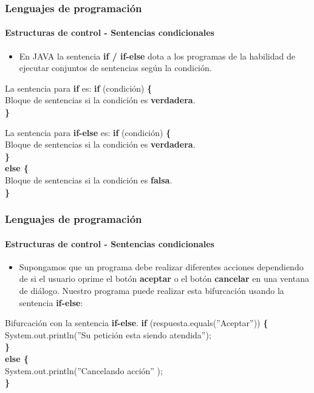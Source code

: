 \documentclass{beamer}
\begin{document}
\begin{frame}
  \frametitle{Lenguajes de programación}
  \framesubtitle{Estructuras de control - Sentencias condicionales}

  \begin{itemize}
  \item En JAVA la sentencia \textbf{if / if-else}  dota a los programas de la habilidad de ejecutar conjuntos de sentencias según la condición.
  \end{itemize}

  \begin{block}{La sentencia para \textbf{if} es:}
    {\scriptsize
      \textbf{if} (condición) \textbf{\{} \\
      \hspace{0.3cm} Bloque de sentencias si la condición es \textbf{verdadera}.  \\
      \textbf{\}}
    }
  \end{block}

  \begin{block}{La sentencia para \textbf{if-else} es:}
    {\scriptsize
      \textbf{if} (condición) \textbf{\{} \\
      \hspace{0.3cm} Bloque de sentencias si la condición es \textbf{verdadera}.  \\
      \textbf{\}}\\
      \textbf{else \{}\\
      \hspace{0.3cm} Bloque de sentencias si la condición es \textbf{falsa}.  \\
      \textbf{\}}
    }
  \end{block}
\end{frame}

\begin{frame}
  \frametitle{Lenguajes de programación}
  \framesubtitle{Estructuras de control - Sentencias condicionales}

  \begin{itemize}
  \item Supongamos que un programa debe realizar diferentes acciones dependiendo de si el usuario oprime el botón \textbf{aceptar} o el botón \textbf{cancelar} en una ventana de diálogo. Nuestro programa puede realizar esta bifurcación usando la sentencia \textbf{if-else}:
  \end{itemize}
  
  \begin{block}{Bifurcación con la sentencia \textbf{if-else}.}
    {\scriptsize
      \textbf{if} (respuesta.equals(''Aceptar'')) \textbf{\{} \\
      \hspace{0.3cm} System.out.println(''Su petición esta siendo atendida'');  \\
      \textbf{\}}\\
      \textbf{else \{}\\
      \hspace{0.3cm} System.out.println(''Cancelando acción'' );  \\
      \textbf{\}}
    }
  \end{block}
\end{frame}
\end{document}
